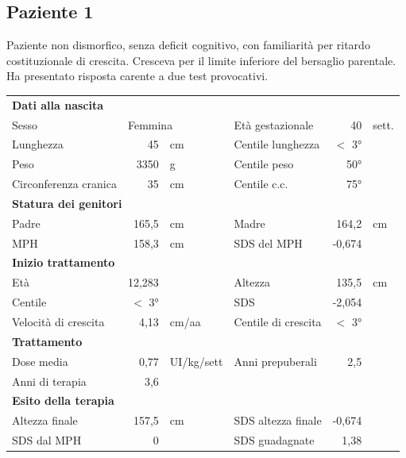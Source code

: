 \clearpage

\subsection*{Paziente 1} %

Paziente non dismorfico, senza deficit cognitivo, con familiarità per ritardo costituzionale di crescita. 
Cresceva per il limite inferiore del bersaglio parentale.
Ha presentato risposta carente a due test provocativi.

\begin{table}[!h]
\begin{tabular}{lrllrl}
\toprule
\multicolumn{6}{l}{\textbf{Dati alla nascita}}\\
Sesso 		& \multicolumn{2}{l}{Femmina} 	& Età gestazionale 		& 40 		& sett.\\
Lunghezza 	& 45 		& cm 				& Centile lunghezza		& $<$ 3° 		\\
Peso 		& 3350 		& g					& Centile peso			& 50° \\
Circonferenza cranica	& 35 		& cm 	& Centile c.c.			& 75° \\
\midrule
\multicolumn{6}{l}{\textbf{Statura dei genitori}}\\
Padre 		& 165,5 & cm 	& Madre 				& 164,2 & cm \\
MPH 		& 158,3 & cm 	& SDS del MPH 			& -0,674\\
\midrule
\multicolumn{6}{l}{\textbf{Inizio trattamento}} \\
Età	& 12,283 & 		& Altezza 				& 135,5 & cm  \\
Centile & $<$ 3° 	 &		& SDS		& -2,054 \\
Velocità di crescita & 4,13 & cm/aa	& Centile di crescita & $<$ 3°\\
\midrule
\multicolumn{6}{l}{\textbf{Trattamento}} \\
Dose media		& 0,77 & UI/kg/sett & Anni prepuberali & 2,5\\
Anni di terapia & 3,6\\
\midrule
\multicolumn{6}{l}{\textbf{Esito della terapia}} \\
Altezza finale			& 157,5 & cm 	& SDS altezza finale		& -0,674\\
SDS dal MPH				& 0 	& 		& SDS guadagnate 			& 1,38\\
\bottomrule
\end{tabular}
\end{table}
\clearpage

